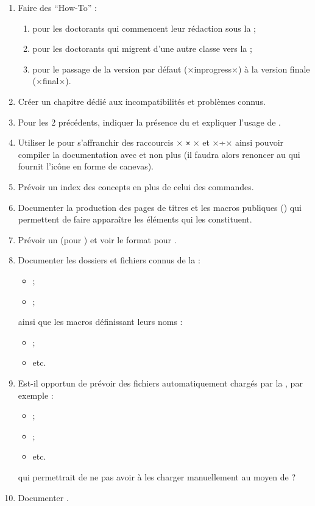 \begin{enumerate}
\item Faire des \enquote{How-To} :
  \begin{enumerate}
  \item pour les doctorants qui commencent leur rédaction sous la \yatcl{} ;
  \item pour les doctorants qui migrent d'une autre classe vers la \yatcl{} ;
  \item pour le passage de la version par défaut (×inprogress×)
    à la version finale (×final×).
  \end{enumerate}
\item Créer un chapitre dédié aux incompatibilités et problèmes connus.
\item Pour les 2 précédents, indiquer la présence du  et
  expliquer l'usage de .
\item Utiliser le  pour s'affranchir des raccourcis
  \lstDeleteShortInline×%
  \lstinline|×|
  \lstMakeShortInline[style=dbtex]×%
  et ×÷× ainsi pouvoir compiler la documentation avec  et non
  plus  (il faudra alors renoncer au 
  qui fournit l'icône en forme de canevas).
\item Prévoir un index des concepts en plus de celui des commandes.
\item Documenter la production des pages de titres et les macros publiques
  () qui permettent de faire apparaître les éléments qui
  les constituent.
\item Prévoir un  (pour ) et voir le format
  pour .
\item Documenter les dossiers et fichiers connus de la \yatcl{} :
  \begin{itemize}
  \item \directory{\configurationdirectory} ;
  \item \file{\configurationfile} ;
  \end{itemize}
  ainsi que les macros définissant leurs noms :
  \begin{itemize}
  \item {} ;
  \item etc.
  \end{itemize}
\item Est-il opportun de prévoir des fichiers automatiquement chargés par la
  \yatcl{}, par exemple :
  \begin{itemize}
  \item \file{\acronymsfile} ;
  \item {} ;
  \item etc.
  \end{itemize}
  qui permettrait de ne pas avoir à les charger manuellement au moyen de
   ?
\item Documenter .
\end{enumerate}

%
\iffalse
\fi
